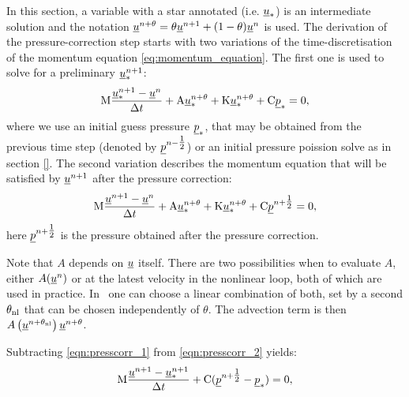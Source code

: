 In this section, a variable with a star annotated (i.e. $\underline{u}_*$) 
is an intermediate solution and the notation 
$\underline{u}^{n+\theta}=\theta \underline{u}^{n+1} + (1-\theta) \underline{u}^{n}$ 
is used.  The derivation of the pressure-correction step starts with two 
variations of the time-discretisation of the 
momentum equation \eqref{eq:momentum_equation}. The first 
one is used to solve for a preliminary $\underline{u}_*^{n+1}$:
\begin{equation}\label{eqn:presscorr_1}
\mathrm{M}  \frac{{\underline{u}_*^{n+1}-\underline{u}^{n}}}{\Delta t}
    +\mathrm{A}\underline{u}_*^{n+\theta}+\mathrm{K}\underline{u}_*^{n+\theta}
    +\mathrm{C} \underline{p}_*
    =0,
\end{equation}
where we use an initial guess pressure $\underline{p}_*$, that may 
be obtained from the previous time step (denoted by 
$\underline{p}^{n-\tfrac 12}$) or an initial
pressure poission solve as in section \ref{}. The second variation
describes the momentum equation that will be satisfied by
$\underline{u}^{n+1}$ after the pressure correction:
\begin{equation}\label{eqn:presscorr_2}
\mathrm{M}  \frac{{\underline{u}^{n+1}-\underline{u}^{n}}}{\Delta t}
    +\mathrm{A}\underline{u}_*^{n+\theta}+\mathrm{K}\underline{u}_*^{n+\theta}
    +\mathrm{C} \underline{p}^{n+\tfrac 12}
    =0,
\end{equation}
here $\underline{p}^{n+\tfrac 12}$ is the pressure 
obtained after the pressure correction.

Note that $A$ depends on $\underline{u}$ itself. There are two possibilities when 
to evaluate $A$, either $A(\underline{u}^n)$ or at the latest velocity in the 
nonlinear loop, both of which are used in practice. In \fluidity\ 
one can choose a linear combination of both, set by 
a second $\theta_{\mathrm{nl}}$ that can be chosen independently of
$\theta$. The advection term is then
$A\left(\underline{u}^{n+\theta_{\mathrm{nl}}}\right)\underline{u}^{n+\theta}$.


Subtracting \eqref{eqn:presscorr_1} from \eqref{eqn:presscorr_2} yields:
\begin{equation}\label{eqn:presscorr_substract}
\mathrm{M}  \frac{{\underline{u}^{n+1}-\underline{u}_*^{n+1}}}{\Delta t}
    + \mathrm{C} ( \underline{p}^{n+\tfrac 12} - \underline{p}_*)
    =0,
\end{equation}

